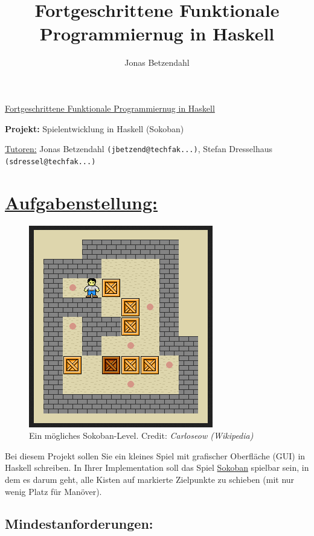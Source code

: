 \documentclass[10pt,a4paper]{article}
\author{Jonas Betzendahl}
\title{Fortgeschrittene Funktionale Programmiernug in Haskell}
\begin{document}
\huge \underline{Fortgeschrittene Funktionale Programmiernug in Haskell}\smallskip

\Large
\begin{center}
\textbf{Projekt:} Spielentwicklung in Haskell (Sokoban)\bigskip

\normalsize
\underline{Tutoren:}
Jonas Betzendahl \texttt{(jbetzend@techfak...)},
Stefan Dresselhaus \texttt{(sdressel@techfak...)}
\end{center}
\normalsize

\section*{\underline{Aufgabenstellung:}}

\begin{figure}
  \vspace{-30pt}
  \begin{center}
    \includegraphics[scale=0.5]{sokoban.png} 
  \end{center}
  \vspace{-15pt}
  \caption{Ein mögliches Sokoban-Level. Credit: \emph{Carloseow (Wikipedia)}}
  \vspace{-90pt}
\end{figure}

Bei diesem Projekt sollen Sie ein kleines Spiel mit grafischer Oberfläche (GUI) in Haskell schreiben. In Ihrer Implementation soll das Spiel \href{http://en.wikipedia.org/wiki/Sokoban}{Sokoban} spielbar sein, in dem es darum geht, alle Kisten auf markierte Zielpunkte zu schieben (mit nur wenig Platz für Manöver).

\subsection*{Mindestanforderungen:}
\end{document}
